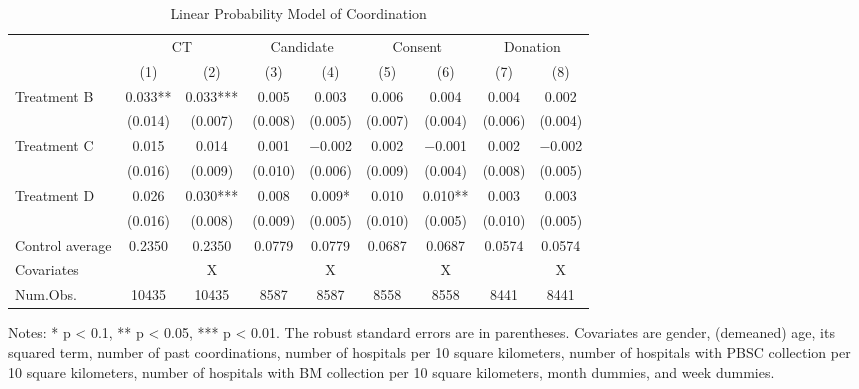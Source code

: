 \documentclass[
  11pt,
  a4paper
]{article}
\begin{document}
\begin{table}

\caption{\label{tab:est-full-coordination}Linear Probability Model of Coordination}
\centering
\fontsize{9}{11}\selectfont
\begin{threeparttable}
\begin{tabular}[t]{lcccccccc}
\toprule
\multicolumn{1}{c}{ } & \multicolumn{2}{c}{CT} & \multicolumn{2}{c}{Candidate} & \multicolumn{2}{c}{Consent} & \multicolumn{2}{c}{Donation} \\
\cmidrule(l{3pt}r{3pt}){2-3} \cmidrule(l{3pt}r{3pt}){4-5} \cmidrule(l{3pt}r{3pt}){6-7} \cmidrule(l{3pt}r{3pt}){8-9}
  & (1) & (2) & (3) & (4) & (5) & (6) & (7) & (8)\\
\midrule
Treatment B & \num{0.033}** & \num{0.033}*** & \num{0.005} & \num{0.003} & \num{0.006} & \num{0.004} & \num{0.004} & \num{0.002}\\
 & (\num{0.014}) & (\num{0.007}) & (\num{0.008}) & (\num{0.005}) & (\num{0.007}) & (\num{0.004}) & (\num{0.006}) & (\num{0.004})\\
Treatment C & \num{0.015} & \num{0.014} & \num{0.001} & \num{-0.002} & \num{0.002} & \num{-0.001} & \num{0.002} & \num{-0.002}\\
 & (\num{0.016}) & (\num{0.009}) & (\num{0.010}) & (\num{0.006}) & (\num{0.009}) & (\num{0.004}) & (\num{0.008}) & (\num{0.005})\\
Treatment D & \num{0.026} & \num{0.030}*** & \num{0.008} & \num{0.009}* & \num{0.010} & \num{0.010}** & \num{0.003} & \num{0.003}\\
 & (\num{0.016}) & (\num{0.008}) & (\num{0.009}) & (\num{0.005}) & (\num{0.010}) & (\num{0.005}) & (\num{0.010}) & (\num{0.005})\\
\midrule
Control average & 0.2350 & 0.2350 & 0.0779 & 0.0779 & 0.0687 & 0.0687 & 0.0574 & 0.0574\\
Covariates &  & X &  & X &  & X &  & X\\
Num.Obs. & \num{10435} & \num{10435} & \num{8587} & \num{8587} & \num{8558} & \num{8558} & \num{8441} & \num{8441}\\
\bottomrule
\end{tabular}
\begin{tablenotes}
\item Notes: * p < 0.1, ** p < 0.05, *** p < 0.01. The robust standard errors are in parentheses. Covariates are gender, (demeaned) age, its squared term, number of past coordinations, number of hospitals per 10 square kilometers, number of hospitals with PBSC collection per 10 square kilometers, number of hospitals with BM collection per 10 square kilometers, month dummies, and week dummies.
\end{tablenotes}
\end{threeparttable}
\end{table}
\end{document}
